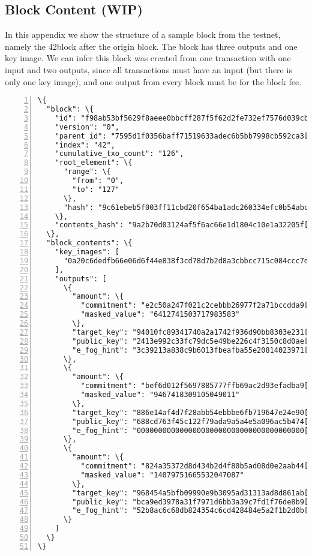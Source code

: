 \begin{appendices}
\chapter{Block Content (WIP)}
\label{appendix:block-content}

In this appendix we show the structure of a sample block from the testnet, namely the 42\nd block after the origin block. The block has three outputs and one key image. We can infer this block was created from one transaction with one input and two outputs, since all transactions must have an input (but there is only one key image), and one output from every block must be for the block fee.%

\begin{Verbatim}[commandchars=\\\{\}, numbers=left]
\{
  "block": \{
    "id": "f98ab53bf5629f8aeee0bbcff287f5f62d2fe732ef7576d039cbab4f761e0756",
    "version": "0",
    "parent_id": "7595d1f0356baff71519633adec6b5bb7998cb592ca3[...]819f2c5833ee",
    "index": "42",
    "cumulative_txo_count": "126",
    "root_element": \{
      "range": \{
        "from": "0",
        "to": "127"
      \},
      "hash": "9c61ebeb5f003ff11cbd20f654ba1adc260334efc0b54abca7a7c755f4c2c160"
    \},
    "contents_hash": "9a2b70d03124af5f6ac66e1d1804c10e1a32205f[...]1cf738850b6e"
  \},
  "block_contents": \{
    "key_images": [
      "0a20c6dedfb66e06d6f44e838f3cd78d7b2d8a3cbbcc715c084ccc7d496c1f58c61a"
    ],
    "outputs": [
      \{
        "amount": \{
          "commitment": "e2c50a247f021c2cebbb26977f2a71bccdda9[...]b1b4d89e5123",
          "masked_value": "6412741503717983583"
        \},
        "target_key": "94010fc89341740a2a1742f936d90bb8303e231[...]87842ca49e3e",
        "public_key": "2413e992c33fc79dc5e49be226c4f3150c8d0ae[...]30c413a3a95e",
        "e_fog_hint": "3c39213a838c9b6013fbeafba55e20814023971[...]26396d7a0100"
      \},
      \{
        "amount": \{
          "commitment": "bef6d012f5697885777ffb69ac2d93efadba9[...]105baf33f331",
          "masked_value": "9467418309105049011"
        \},
        "target_key": "886e14af4d7f28abb54ebbbe6fb719647e24e90[...]0a6bf765dc43",
        "public_key": "688cd763f45c122f79ada9a5a4e5a096ac5b474[...]c7bab5205b61",
        "e_fog_hint": "000000000000000000000000000000000000000[...]000000000000"
      \},
      \{
        "amount": \{
          "commitment": "824a35372d8d434b2d4f80b5ad08d0e2aab44[...]7a9096a6867e",
          "masked_value": "14079751665532047087"
        \},
        "target_key": "968454a5bfb09990e9b3095ad31313ad8d861ab[...]26b35b973838",
        "public_key": "bca9ed3978a31f7971d6bb3a39c7fd1f76de8b9[...]7f39524c1f33",
        "e_fog_hint": "52b8ac6c68db824354c6cd428484e5a2f1b2d0b[...]a753bf7f0100"
      \}
    ]
  \}
\}
\end{Verbatim}




\end{appendices}
